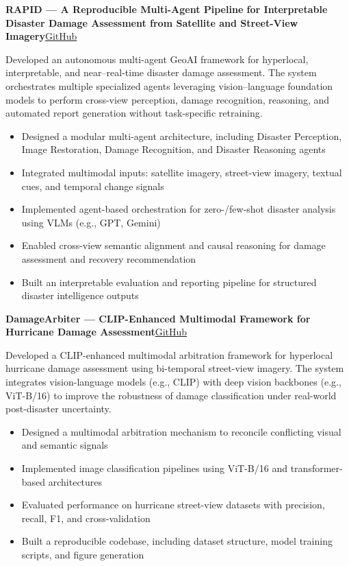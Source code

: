\documentclass[10pt,letterpaper]{article}
\newcommand{\entry}[2]{%
  \par\vspace{0.30em}\noindent\textbf{#1}\hfill{\small #2}\par}
\newenvironment{tight}
  {\begin{itemize}[leftmargin=1.25em,itemsep=0.10em,topsep=0.20em,parsep=0pt,label=\textbullet]}
  {\end{itemize}}
\begin{document}
\entry{RAPID --- A Reproducible Multi-Agent Pipeline for Interpretable Disaster Damage Assessment from Satellite and Street-View Imagery}{\href{https://github.com/rayford295/RAPID}{GitHub}}
\vspace{0.15em}
Developed an autonomous multi-agent GeoAI framework for hyperlocal, interpretable, and near--real-time disaster damage assessment. The system orchestrates multiple specialized agents leveraging vision--language foundation models to perform cross-view perception, damage recognition, reasoning, and automated report generation without task-specific retraining.
\begin{tight}
  \item Designed a modular multi-agent architecture, including Disaster Perception, Image Restoration, Damage Recognition, and Disaster Reasoning agents
  \item Integrated multimodal inputs: satellite imagery, street-view imagery, textual cues, and temporal change signals
  \item Implemented agent-based orchestration for zero-/few-shot disaster analysis using VLMs (e.g., GPT, Gemini)
  \item Enabled cross-view semantic alignment and causal reasoning for damage assessment and recovery recommendation
  \item Built an interpretable evaluation and reporting pipeline for structured disaster intelligence outputs
\end{tight}

\entry{DamageArbiter --- CLIP-Enhanced Multimodal Framework for Hurricane Damage Assessment}{\href{https://github.com/rayford295/DamageArbiter}{GitHub}}
\vspace{0.15em}
Developed a CLIP-enhanced multimodal arbitration framework for hyperlocal hurricane damage assessment using bi-temporal street-view imagery. The system integrates vision-language models (e.g., CLIP) with deep vision backbones (e.g., ViT-B/16) to improve the robustness of damage classification under real-world post-disaster uncertainty.
\begin{tight}
  \item Designed a multimodal arbitration mechanism to reconcile conflicting visual and semantic signals
  \item Implemented image classification pipelines using ViT-B/16 and transformer-based architectures
  \item Evaluated performance on hurricane street-view datasets with precision, recall, F1, and cross-validation
  \item Built a reproducible codebase, including dataset structure, model training scripts, and figure generation
\end{tight}
\end{document}
